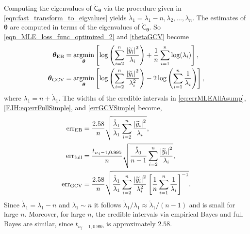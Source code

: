 \documentclass{iitthesis}          %
\newcommand{\bm}[1]{\boldsymbol{#1}}
\newcommand{\rlambda}{\mathring{\lambda}}
\newcommand{\vtheta}{{\bm{\theta}}}
\newcommand{\rmC}{\mathring{\mathsf{C}}}
\newcommand{\MLE}{\textup{EB}}
\newcommand{\GCV}{\textup{GCV}}
\newcommand{\err}{\textup{err}}
\def\abs#1{\ensuremath{\left \lvert #1 \right \rvert}}
\providecommand{\argmin}{\operatorname*{argmin}}
\begin{document}
Computing the eigenvalues of $\rmC_\vtheta$ via the procedure given in \eqref{eqn:fast_transform_to_eigvalues} yields $\rlambda_1 = \lambda_1 - n, \lambda_2, \ldots, \lambda_n$. The estimates of $\vtheta$ are computed in terms of the eigenvalues of $\rmC_\vtheta$.  So \eqref{eqn_MLE_loss_func_optimized_2} and \eqref{thetaGCV} become
\begin{subequations}
	\label{thetaSimple}
	\begin{align}
	\vtheta_\MLE
	&= 
	\argmin_{\vtheta}
	\left[
	\log\left(
	\sum_{i=2}^n \frac{\abs{\widetilde{y}_i}^2}{\lambda_i}
	\right) 
	+ 
	\frac{1}{n}\sum_{i=1}^n \log(\lambda_i)
	\right], \\
	\vtheta_{\GCV} 
	&= \argmin_\vtheta \left[ \log \left ( \sum_{i=2}^n \frac{\abs{\widetilde{y}_i}^2}{\lambda_i^2} 
	\right)  -2\log\left( \sum_{i=1}^n \frac{1}{\lambda_i} \right)
	\right],
	\end{align}
\end{subequations}
where $\lambda_1 = n + \rlambda_1$.  The widths of the credible intervals in \eqref{eq:errMLEAllAsump}, \eqref{FJH:eq:errFullSimple}, and   \eqref{errGCVSimple} become,
\begin{subequations}
	\label{fastStoppingCriterions}
	\begin{align}
	\label{fastStoppingCriterionMLE}
	\err_\MLE  &
	=
	\frac{2.58}{n}\sqrt{
		\frac{\rlambda_1}{\lambda_1}
		\sum_{i=2}^{n} \frac{\abs{\widetilde{y}_i}^2}{\lambda_i}  
	}, 
	\\
	\label{fastStoppingCriterionFull}
	\err_{\textup{full}} 
	& = \frac{t_{n_j-1,0.995}}{n} \sqrt{
		\frac{\rlambda_1}{n-1} \sum_{i=2}^n \frac{\abs{\widetilde{y}_i}^2}{\lambda_i}
	}, \\
	\label{fastStoppingCriterionGCV}
	\err_{\textup{GCV}} & =
	\frac{2.58}{n}\sqrt{	\frac{\rlambda_1}{\lambda_1} \sum_{i=2}^n \frac{\abs{\widetilde{y}_i}^2}{\lambda_i^2}  \left [ \frac 1n \sum_{i=1}^n \frac{1}{\lambda_i} \right]^{-1}} .
	\end{align}
\end{subequations}
Since $\rlambda_1 = \lambda_1 - n$ and $\lambda_1 \sim n$ it follows $\rlambda_1/\lambda_1 \approx \rlambda_1/(n-1)$ and is small for  large $n$.  Moreover, for large $n$, the credible intervals via empirical Bayes and full Bayes are similar, since $t_{n_j-1,0.995}$ is approximately $2.58$. 
\end{document}
